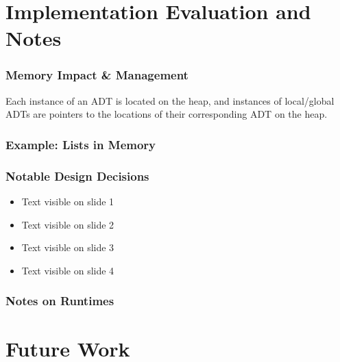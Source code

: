 \documentclass{beamer}
\begin{document}
\section{Implementation Evaluation and Notes}

\begin{frame}
\frametitle{Memory Impact \& Management}

Each instance of an ADT is located on the heap, and instances of local/global ADTs are pointers to the locations of their corresponding ADT on the heap.

\end{frame}

\begin{frame}
\frametitle{Example: Lists in Memory}
\begin{figure}
  
\end{figure}
\end{frame}


\begin{frame}
\frametitle{Notable Design Decisions}

\begin{itemize}
 \item<1-> Text visible on slide 1
 \item<2-> Text visible on slide 2
 \item<3-> Text visible on slide 3
 \item<4-> Text visible on slide 4
\end{itemize}

\end{frame}

\begin{frame}
\frametitle{Notes on Runtimes}
\end{frame}

\section{Future Work}
\end{document}
